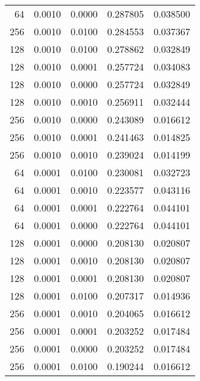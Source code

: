 \begin{tabular}{rrrrr}
  64 &  0.0010 &  0.0000 &  0.287805 &  0.038500 \\
 256 &  0.0010 &  0.0100 &  0.284553 &  0.037367 \\
 128 &  0.0010 &  0.0100 &  0.278862 &  0.032849 \\
 128 &  0.0010 &  0.0001 &  0.257724 &  0.034083 \\
 128 &  0.0010 &  0.0000 &  0.257724 &  0.032849 \\
 128 &  0.0010 &  0.0010 &  0.256911 &  0.032444 \\
 256 &  0.0010 &  0.0000 &  0.243089 &  0.016612 \\
 256 &  0.0010 &  0.0001 &  0.241463 &  0.014825 \\
 256 &  0.0010 &  0.0010 &  0.239024 &  0.014199 \\
  64 &  0.0001 &  0.0100 &  0.230081 &  0.032723 \\
  64 &  0.0001 &  0.0010 &  0.223577 &  0.043116 \\
  64 &  0.0001 &  0.0001 &  0.222764 &  0.044101 \\
  64 &  0.0001 &  0.0000 &  0.222764 &  0.044101 \\
 128 &  0.0001 &  0.0000 &  0.208130 &  0.020807 \\
 128 &  0.0001 &  0.0010 &  0.208130 &  0.020807 \\
 128 &  0.0001 &  0.0001 &  0.208130 &  0.020807 \\
 128 &  0.0001 &  0.0100 &  0.207317 &  0.014936 \\
 256 &  0.0001 &  0.0010 &  0.204065 &  0.016612 \\
 256 &  0.0001 &  0.0001 &  0.203252 &  0.017484 \\
 256 &  0.0001 &  0.0000 &  0.203252 &  0.017484 \\
 256 &  0.0001 &  0.0100 &  0.190244 &  0.016612 \\
\bottomrule
\end{tabular}
